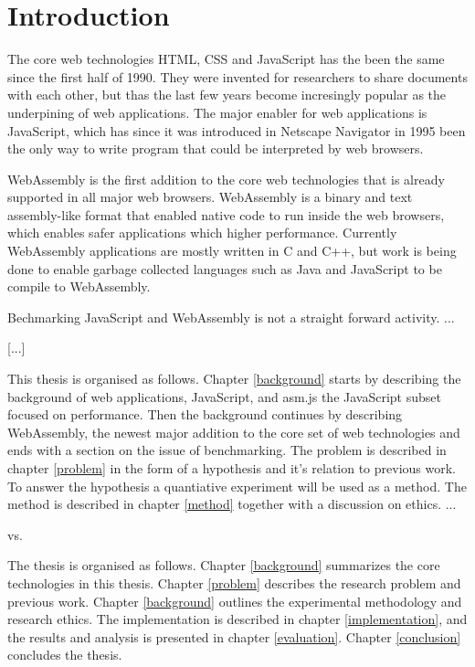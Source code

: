 \section{Introduction}

The core web technologies HTML, CSS and JavaScript has the been the same since the first half of 1990. They were invented for researchers to share documents with each other, but thas the last few years become incresingly popular as the underpining of web applications. The major enabler for web applications is JavaScript, which has since it was introduced in Netscape Navigator in 1995 been the only way to write program that could be interpreted by web browsers.

WebAssembly is the first addition to the core web technologies that is already supported in all major web browsers. WebAssembly is a binary and text assembly-like format that enabled native code to run inside the web browsers, which enables safer applications which higher performance. Currently WebAssembly applications are mostly written in C and C++, but work is being done to enable garbage collected languages such as Java and JavaScript to be compile to WebAssembly.

Bechmarking JavaScript and WebAssembly is not a straight forward activity. ...

[...]

This thesis is organised as follows. Chapter \ref{background} starts by describing the background of web applications, JavaScript, and asm.js the JavaScript subset focused on performance. Then the background continues by describing WebAssembly, the newest major addition to the core set of web technologies and ends with a section on the issue of benchmarking. The problem is described in chapter \ref{problem} in the form of a hypothesis and it's relation to previous work. To answer the hypothesis a quantiative experiment will be used as a method. The method is described in chapter \ref{method} together with a discussion on ethics. ...

vs.

The thesis is organised as follows. Chapter \ref{background} summarizes the core technologies in this thesis. Chapter \ref{problem} describes the research problem and previous work. Chapter \ref{background} outlines the experimental methodology and research ethics. The implementation is described in chapter \ref{implementation}, and the results and analysis is presented in chapter \ref{evaluation}. Chapter \ref{conclusion} concludes the thesis.
